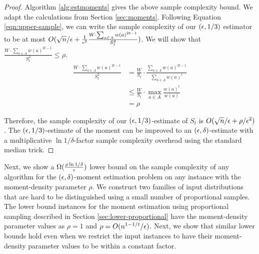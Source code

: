 \begin{proof} Algorithm \ref{alg:estmoments} gives the above sample complexity bound. We adapt the calculations from Section \ref{sec:moments}. Following Equation \ref{eqn:upper-sample}, we can write the sample complexity of our $(\epsilon,1/3)$ estimator to be at most $O(\sqrt{n}/\epsilon + \frac{1}{\epsilon^2} \frac{W\cdot \sum_{a\in A} w(a)^{2t-1}}{S_t^2})$. We will show that $\frac{W\cdot \sum_{a\in A} w(a)^{2t-1}}{S_t^2} \leq \rho$.  
\begin{align*}
\frac{W\cdot \sum_{a\in A} w(a)^{2t-1}}{S_t^2}
& = \frac{W}{S_t} \cdot \frac{\sum_{a\in A} w(a)^{2t-1}}{\sum_{a\in A} w(a)^t}\\
& \leq \frac{W}{S_t} \cdot \max_{a\in A} \frac{w(a)^t}{w(a)}\\
&= \rho
\end{align*}

Therefore, the sample complexity of our $(\epsilon,1/3)$-estimate of $S_t$ is $O({\sqrt{n}}/{\epsilon}+\rho/\epsilon^2)$. The $(\epsilon,1/3)$-estimate of the moment can be improved to an $(\epsilon,\delta)$-estimate with a multiplicative $\ln 1/\delta$-factor sample complexity overhead using the standard median trick.
\end{proof}
Next, we show a $\Omega(\frac{\rho \ln 1/\delta}{\epsilon})$ lower bound on the sample complexity of any algorithm for the $(\epsilon,\delta)$-moment estimation problem on any instance with the moment-density parameter $\rho$. We construct two families of input distributions that are hard to be distinguished using a small number of proportional samples. The lower bound instances for the moment estimation using proportional sampling described in Section \ref{sec:lower-proportional} have the moment-density parameter values as $\rho=1$ and $\rho=O(n^{1-1/t}/\epsilon)$. Next, we show that similar lower bounds hold even when we restrict the input instances to have their moment-density parameter values to be within a constant factor.

